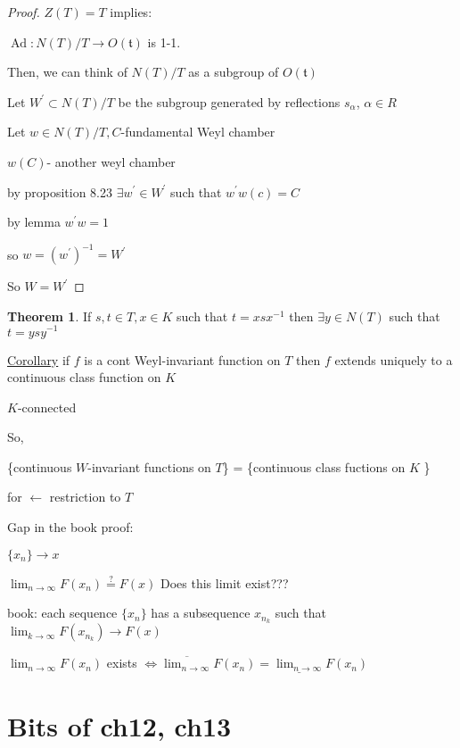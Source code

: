 \documentclass{article}
\theoremstyle{definition}
\newtheorem{theorem}{Theorem}
\newcommand{\Ad}{\operatorname{Ad}}
\begin{document}
\begin{proof}
    \(Z(T)=T\) implies:

    \(\Ad : N(T) / T \to O(\mathfrak{t})\) is 1-1.
    
    Then, we can think of \(N(T) / T\) as a subgroup of \(O(\mathfrak{t})\)
    
    Let \(W^{\prime} \subset N(T) / T\) be the subgroup generated by reflections \(s_\alpha\), \(\alpha \in R\)
    
    Let \(w\in N(T) / T, C\)-fundamental Weyl chamber
    
    \(w(C)\)- another weyl chamber

    by proposition 8.23 \(\exists w^{\prime} \in W^{\prime}\) such that \(w^{\prime} w(c)=C\)
    
    by lemma \(w^{\prime} w=1\)
    
    so \(w = (w^{\prime})^{-1} = W^{\prime}\)
    
    So \(W = W^{\prime}\) 
\end{proof}

\begin{theorem}
    If \(s,t\in T, x\in K\) such that \(t = x s x ^{-1}\) then \(\exists y\in N(T)\) such that \(t = y s y ^{-1}\)   
\end{theorem}

\underline{Corollary} if \(f\) is a cont Weyl-invariant function on \(T\) then \(f\) extends uniquely to a continuous class function on \(K\) 

\(K\)-connected

So,

\{continuous \(W\)-invariant functions on \(T\)\} = \{continuous class fuctions on \(K\) \}

for \(\leftarrow\)  restriction to \(T\) 

Gap in the book proof:

\(\{ x_n \} \to x\) 

\(\lim_{n \to \infty} F(x_n) \overset{?}{=} F(x)\) Does this limit exist???

book: each sequence \(\{ x_n \}\) has a subsequence \(x_{n_k}\) such that \(\lim_{k \to \infty} F(x_{n_k}) \to F(x)\)  

\(\lim_{n \to \infty} F(x_n)\) exists \(\iff \overline{\lim_{n \to \infty}} F(x_n) = \underline{\lim_{n \to \infty}} F(x_n) \)  

\section*{Bits of ch12, ch13}
\end{document}
